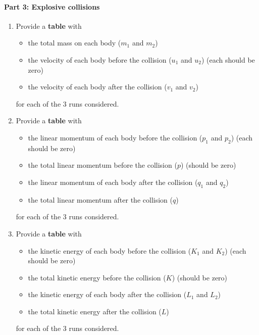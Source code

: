 \paragraph{Part 3: Explosive collisions}
%
\begin{enumerate}
    \item Provide a \textbf{table} with
    \begin{itemize}
        \item the total mass on each body ($m_{1}$ and $m_{2}$)
        \item the velocity of each body before the collision ($u_{1}$ and $u_{2}$) (each should be zero)
        \item the velocity of each body after the collision ($v_{1}$ and $v_{2}$)
    \end{itemize}
    for each of the 3 runs considered.
    \item Provide a \textbf{table} with
    \begin{itemize}
        \item the linear momentum of each body before the collision ($p_{1}$ and $p_{2}$) (each should be zero)
        \item the total linear momentum before the collision ($p$) (should be zero)
        \item the linear momentum of each body after the collision ($q_{1}$ and $q_{2}$)
        \item the total linear momentum after the collision ($q$)
    \end{itemize}
    for each of the 3 runs considered.
    \item Provide a \textbf{table} with
    \begin{itemize}
        \item the kinetic energy of each body before the collision ($K_{1}$ and $K_{2}$) (each should be zero)
        \item the total kinetic energy before the collision ($K$) (should be zero)
        \item the kinetic energy of each body after the collision ($L_{1}$ and $L_{2}$)
        \item the total kinetic energy after the collision ($L$)
    \end{itemize}
    for each of the 3 runs considered.
\end{enumerate}
%
